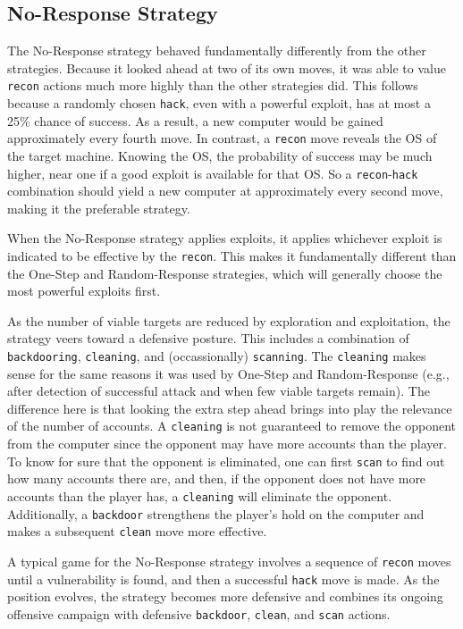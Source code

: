 \subsection{No-Response Strategy}
The No-Response strategy behaved fundamentally differently from the other strategies.
Because it looked ahead at two of its own moves, it was able to value {\tt recon} actions much more highly than the other strategies did.
This follows because a randomly chosen {\tt hack}, even with a powerful exploit, has at most a 25\% chance of success.
As a result, a new computer would be gained approximately every fourth move.
In contrast, a {\tt recon} move reveals the OS of the target machine.
Knowing the OS, the probability of success may be much higher, near one if a good exploit is available for that OS.
So a {\tt recon}-{\tt hack} combination should yield a new computer at approximately every second move, making it the preferable strategy.

When the No-Response strategy applies exploits, it applies whichever exploit is indicated to be effective by the {\tt recon}.
This makes it fundamentally different than the One-Step and Random-Response strategies, which will generally choose the most powerful exploits first.

As the number of viable targets are reduced by exploration and exploitation, the strategy veers toward a defensive posture.
This includes a combination of {\tt backdooring}, {\tt cleaning}, and (occassionally) {\tt scanning}.
The {\tt cleaning} makes sense for the same reasons it was used by One-Step and Random-Response (e.g., after detection of successful attack and when few viable targets remain).
The difference here is that looking the extra step ahead brings into play the relevance of the number of accounts.
A {\tt cleaning} is not guaranteed to remove the opponent from the computer since the opponent may have more accounts than the player.
To know for sure that the opponent is eliminated, one can first {\tt scan} to find out how many accounts there are, and then, if the opponent does not have more accounts than the player has, a {\tt cleaning} will eliminate the opponent.
Additionally, a {\tt backdoor} strengthens the player's hold on the computer and makes a subsequent {\tt clean} move more effective.

A typical game for the No-Response strategy involves a sequence of {\tt recon} moves until a vulnerability is found, and then a successful {\tt hack} move is made.
As the position evolves, the strategy becomes more defensive and combines its ongoing offensive campaign with defensive {\tt backdoor}, {\tt clean}, and  {\tt scan} actions.

